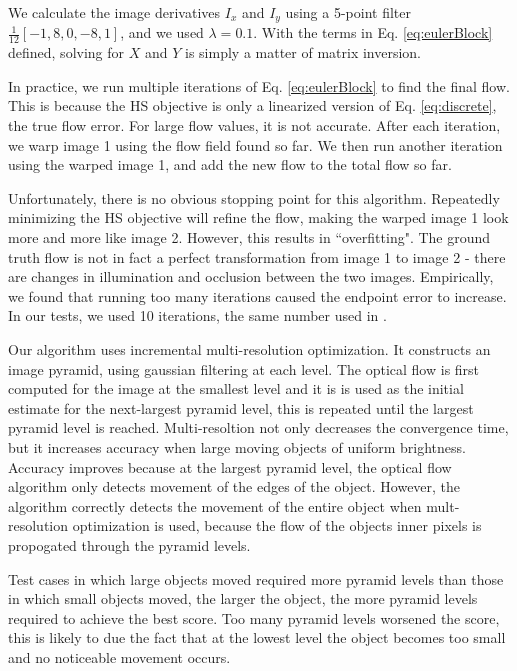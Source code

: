 \documentclass[10pt,twocolumn,letterpaper]{article}
\begin{document}
We calculate the image derivatives $I_x$ and $I_y$ using a 5-point filter $\frac{1}{12}[-1, 8, 0, -8, 1]$, and we used $\lambda = 0.1$.  With the terms in Eq. \ref{eq:eulerBlock} defined, solving for $X$ and $Y$ is simply a matter of matrix inversion.

In practice, we run multiple iterations of Eq. \ref{eq:eulerBlock} to find the final flow.  This is because the HS objective is only a linearized version of Eq. \ref{eq:discrete}, the true flow error.  For large flow values, it is not accurate.  After each iteration, we warp image 1 using the flow field found so far.  We then run another iteration using the warped image 1, and add the new flow to the total flow so far.

Unfortunately, there is no obvious stopping point for this algorithm.  Repeatedly minimizing the HS objective will refine the flow, making the warped image 1 look more and more like image 2.  However, this results in ``overfitting".  The ground truth flow is not in fact a perfect transformation from image 1 to image 2 - there are changes in illumination and occlusion between the two images.  Empirically, we found that running too many iterations caused the endpoint error to increase.  In our tests, we used 10 iterations, the same number used in \cite{sun}.

Our algorithm uses incremental multi-resolution optimization. It constructs an image pyramid, using gaussian filtering at each level. The optical flow is first computed for the image at the smallest level and it is is used as the initial estimate for the next-largest pyramid level, this is repeated until the largest pyramid level is reached. Multi-resoltion not only decreases the convergence time, but it increases accuracy when large moving objects of uniform brightness. Accuracy improves because at the largest pyramid level, the optical flow algorithm only detects movement of the edges of the object. However, the algorithm correctly detects the movement of the entire object when mult-resolution optimization is used, because the flow of the objects inner pixels is propogated through the pyramid levels.

Test cases in which large objects moved required more pyramid levels than those in which small objects moved, the larger the object, the more pyramid levels required to achieve the best score. Too many pyramid levels worsened the score, this is likely to due the fact that at the lowest level the object becomes too small and no noticeable movement occurs.
\end{document}

